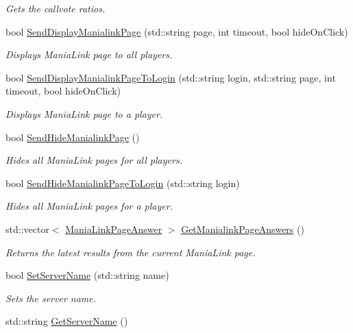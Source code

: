 \begin{DoxyCompactItemize}
\begin{DoxyCompactList}\small\item\em Gets the callvote ratios. \end{DoxyCompactList}\item 
bool \hyperlink{classMethods_ab04b0cae6a36c8202cabf1cd9ebc1a38}{Send\-Display\-Manialink\-Page} (std\-::string page, int timeout, bool hide\-On\-Click)
\begin{DoxyCompactList}\small\item\em Displays Mania\-Link page to all players. \end{DoxyCompactList}\item 
bool \hyperlink{classMethods_a39fd4b15b6f18a74fd686308319e5b51}{Send\-Display\-Manialink\-Page\-To\-Login} (std\-::string login, std\-::string page, int timeout, bool hide\-On\-Click)
\begin{DoxyCompactList}\small\item\em Displays Mania\-Link page to a player. \end{DoxyCompactList}\item 
\hypertarget{classMethods_aaf09c31b63f1eda2362ca24fd1b328ff}{bool \hyperlink{classMethods_aaf09c31b63f1eda2362ca24fd1b328ff}{Send\-Hide\-Manialink\-Page} ()}\label{classMethods_aaf09c31b63f1eda2362ca24fd1b328ff}

\begin{DoxyCompactList}\small\item\em Hides all Mania\-Link pages for all players. \end{DoxyCompactList}\item 
bool \hyperlink{classMethods_af5ec6746b209afdda796330dab55464a}{Send\-Hide\-Manialink\-Page\-To\-Login} (std\-::string login)
\begin{DoxyCompactList}\small\item\em Hides all Mania\-Link pages for a player. \end{DoxyCompactList}\item 
\hypertarget{classMethods_a43c84e59da7eb37e53bbd8f43299c454}{std\-::vector$<$ \hyperlink{structManiaLinkPageAnswer}{Mania\-Link\-Page\-Answer} $>$ \hyperlink{classMethods_a43c84e59da7eb37e53bbd8f43299c454}{Get\-Manialink\-Page\-Answers} ()}\label{classMethods_a43c84e59da7eb37e53bbd8f43299c454}

\begin{DoxyCompactList}\small\item\em Returns the latest results from the current Mania\-Link page. \end{DoxyCompactList}\item 
bool \hyperlink{classMethods_a266f3dda30b8e145f886239933f6d461}{Set\-Server\-Name} (std\-::string name)
\begin{DoxyCompactList}\small\item\em Sets the server name. \end{DoxyCompactList}\item 
\hypertarget{classMethods_afda7117a45597a809eb7326ef7b7887c}{std\-::string \hyperlink{classMethods_afda7117a45597a809eb7326ef7b7887c}{Get\-Server\-Name} ()}\label{classMethods_afda7117a45597a809eb7326ef7b7887c}


\end{DoxyCompactItemize}

